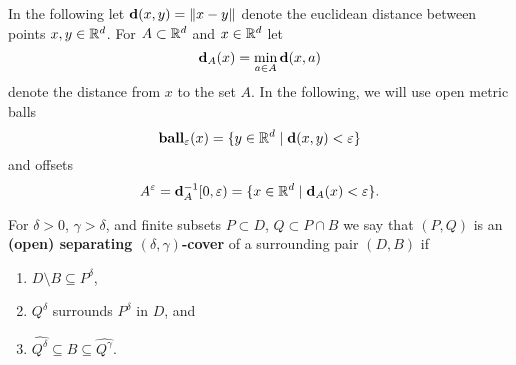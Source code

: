 
In the following let $\mathbf{d}(x, y) = \|x - y\|$ denote the euclidean distance between points $x,y\in \mathbb{R}^d$.
For $A\subset\mathbb{R}^d$ and $x\in \mathbb{R}^d$ let
\[\mathbf{d}_A(x) = \min_{a\in A}\mathbf{d}(x, a)\]
denote the distance from $x$ to the set $A$.
In the following, we will use open metric balls
\[\mathbf{ball}_\varepsilon(x) = \{y\in\mathbb{R}^d\mid \mathbf{d}(x, y) < \varepsilon\}\]
and offsets
\[A^\varepsilon = \mathbf{d}_A^{-1}[0, \varepsilon) = \{x\in \mathbb{R}^d\mid \mathbf{d}_A(x) < \varepsilon\}.\]
\begin{definition}
  For $\delta > 0$, $\gamma > \delta$, and finite subsets $P\subset D$, $Q\subset P\cap B$ we say that $(P, Q)$ is an \textbf{(open) separating $(\delta,\gamma)$-cover} of a surrounding pair $(D, B)$ if
  \begin{enumerate}[label=(\alph*)]
    \item $D\setminus B \subseteq P^\delta$,
    \item $Q^\delta$ surrounds $P^\delta$ in $D$, and
    \item $\hat{Q^\delta}\subseteq B\subseteq \hat{Q^\gamma}$.
  \end{enumerate}
\end{definition}
